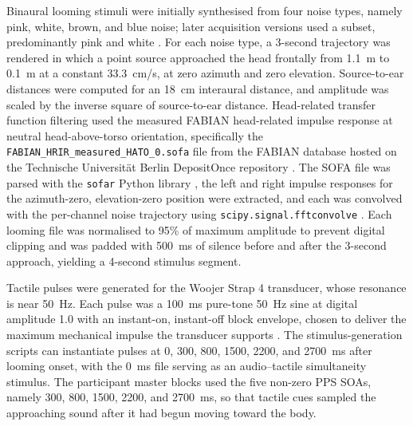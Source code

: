 Binaural looming stimuli were initially synthesised from four noise types, namely pink, white, brown, and blue noise; later acquisition versions used a subset, predominantly pink and white \citep{brinkmann2017fabian}. For each noise type, a 3-second trajectory was rendered in which a point source approached the head frontally from 1.1~m to 0.1~m at a constant 33.3~cm/s, at zero azimuth and zero elevation. Source-to-ear distances were computed for an 18~cm interaural distance, and amplitude was scaled by the inverse square of source-to-ear distance. Head-related transfer function filtering used the measured FABIAN head-related impulse response at neutral head-above-torso orientation, specifically the \texttt{FABIAN\_HRIR\_measured\_HATO\_0.sofa} file from the FABIAN database hosted on the Technische Universit\"at Berlin DepositOnce repository \citep{fabian_database_2017, brinkmann2017fabian}. The SOFA file was parsed with the \texttt{sofar} Python library \citep{sofar_python}, the left and right impulse responses for the azimuth-zero, elevation-zero position were extracted, and each was convolved with the per-channel noise trajectory using \texttt{scipy.signal.fftconvolve} \citep{Virtanen2020SciPy}. Each looming file was normalised to 95\% of maximum amplitude to prevent digital clipping and was padded with 500~ms of silence before and after the 3-second approach, yielding a 4-second stimulus segment.

Tactile pulses were generated for the Woojer Strap 4 transducer, whose resonance is near 50~Hz. Each pulse was a 100~ms pure-tone 50~Hz sine at digital amplitude 1.0 with an instant-on, instant-off block envelope, chosen to deliver the maximum mechanical impulse the transducer supports \citep{woojer_strap4}. The stimulus-generation scripts can instantiate pulses at 0, 300, 800, 1500, 2200, and 2700~ms after looming onset, with the 0~ms file serving as an audio--tactile simultaneity stimulus. The participant master blocks used the five non-zero PPS SOAs, namely 300, 800, 1500, 2200, and 2700~ms, so that tactile cues sampled the approaching sound after it had begun moving toward the body.

